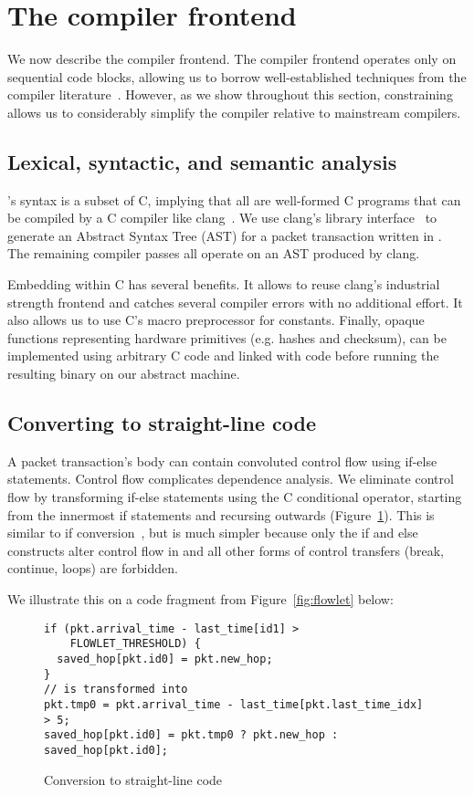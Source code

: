 \section{The \pktlanguage compiler frontend}

We now describe the \pktlanguage compiler frontend. The compiler frontend
operates only on sequential code blocks, allowing us to borrow well-established
techniques from the compiler literature~\cite{muchnik}. However, as we show
throughout this section, constraining \pktlanguage allows us to considerably
simplify the compiler relative to mainstream compilers.

\subsection{Lexical, syntactic, and semantic analysis}
\pktlanguage's syntax is a subset of C, implying that all \pktlanguage are
well-formed C programs that can be compiled by a C compiler like
clang~\cite{clang}. We use clang's library interface~\cite{libclang} to
generate an Abstract Syntax Tree (AST) for a packet transaction written in
\pktlanguage. The remaining compiler passes all operate on an AST produced by
clang.

Embedding \pktlanguage within C has several benefits. It allows to reuse
clang's industrial strength frontend and catches several compiler errors with
no additional effort.  It also allows us to use C's macro preprocessor for
constants. Finally, opaque functions representing hardware primitives (e.g.
hashes and checksum), can be implemented using arbitrary C code and linked with
\pktlanguage code before running the resulting binary on our abstract machine.

\subsection{Converting to straight-line code}
A packet transaction's body can contain convoluted control flow using if-else
statements. Control flow complicates dependence analysis. We eliminate control
flow by transforming if-else statements using the C conditional operator,
starting from the innermost if statements and recursing outwards
(Figure~\ref{fig:if_convert}). This is similar to if
conversion~\cite{allen_if_conversion}, but is much simpler because only the if
and else constructs alter control flow in \pktlanguage and all other forms of
control transfers (break, continue, loops) are forbidden.

We illustrate this on a code fragment from Figure~\ref{fig:flowlet} below:
\begin{figure}
\begin{small}
\begin{lstlisting}
if (pkt.arrival_time - last_time[id1] >
    FLOWLET_THRESHOLD) {
  saved_hop[pkt.id0] = pkt.new_hop;
}
// is transformed into
pkt.tmp0 = pkt.arrival_time - last_time[pkt.last_time_idx] > 5;
saved_hop[pkt.id0] = pkt.tmp0 ? pkt.new_hop : saved_hop[pkt.id0];
\end{lstlisting}
\end{small}
\caption{Conversion to straight-line code}
\label{fig:if_convert}
\end{figure}

